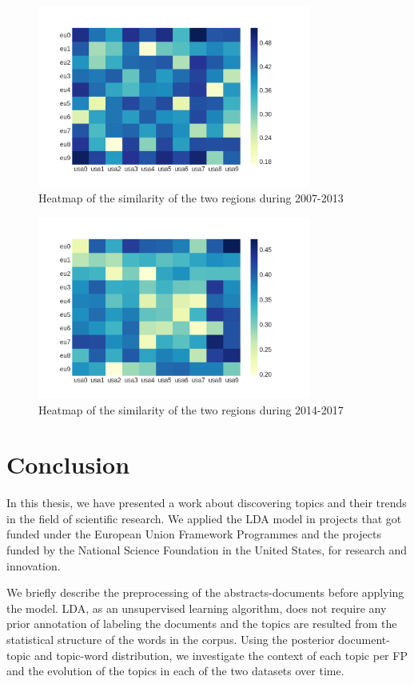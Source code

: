 \documentclass[12pt]{report}
\begin{document}
\begin{figure}
\centering
\includegraphics[width=0.8\textwidth]
{figs/heatmaps/heatmapFP7.png}
\caption{Heatmap of the similarity of the two regions during 2007-2013}
\end{figure}
\begin{figure}
\centering
\includegraphics[width=0.8\textwidth]
{figs/heatmaps/heatmapH2020.png}
\caption{Heatmap of the similarity of the two regions during 2014-2017}
\end{figure}

\section{Conclusion}

In this thesis, we have presented a work about discovering topics and their
trends in the field of scientific research. We applied the LDA model in projects
that got funded under the European Union Framework Programmes and the projects
funded by the National Science Foundation in the United States, for research and
innovation.

We briefly describe the preprocessing of the abstracts-documents before applying
the model. LDA, as an unsupervised learning algorithm, does not require any
prior annotation of labeling the documents and the topics are resulted from the
statistical structure of the words in the corpus. Using the posterior document-
topic and topic-word distribution, we investigate the context of each topic per
FP and the evolution of the topics in each of the two datasets over time.
\end{document}
